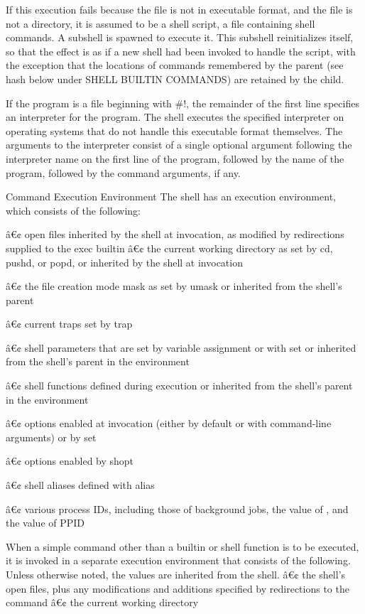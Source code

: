 \documentclass[11pt]{article}
\begin{document}
{{{If this execution fails because the file is not in executable format, and the file is not a directory, it is assumed to be a shell script, a file containing shell commands. A subshell is spawned to execute it. This subshell reinitializes itself, so that the effect is as if a new shell had been invoked to handle the script, with the exception that the locations of commands remembered by the parent (see hash below under SHELL BUILTIN COMMANDS) are retained by the child.

If the program is a file beginning with #!, the remainder of the first line specifies an interpreter for the program. The shell executes the specified interpreter on operating systems that do not handle this executable format themselves. The arguments to the interpreter consist of a single optional argument following the interpreter name on the first line of the program, followed by the name of the program, followed by the command arguments, if any.

Command Execution Environment
The shell has an execution environment, which consists of the following:

â€¢ open files inherited by the shell at invocation, as modified by redirections supplied to the exec builtin
â€¢ the current working directory as set by cd, pushd, or popd, or inherited by the shell at invocation

â€¢ the file creation mode mask as set by umask or inherited from the shell's parent

â€¢ current traps set by trap

â€¢ shell parameters that are set by variable assignment or with set or inherited from the shell's parent in the environment

â€¢ shell functions defined during execution or inherited from the shell's parent in the environment

â€¢ options enabled at invocation (either by default or with command-line arguments) or by set

â€¢ options enabled by shopt

â€¢ shell aliases defined with alias

â€¢ various process IDs, including those of background jobs, the value of $$, and the value of PPID

When a simple command other than a builtin or shell function is to be executed, it is invoked in a separate execution environment that consists of the following. Unless otherwise noted, the values are inherited from the shell.
â€¢ the shell's open files, plus any modifications and additions specified by redirections to the command
â€¢ the current working directory

}}}
\end{document}
